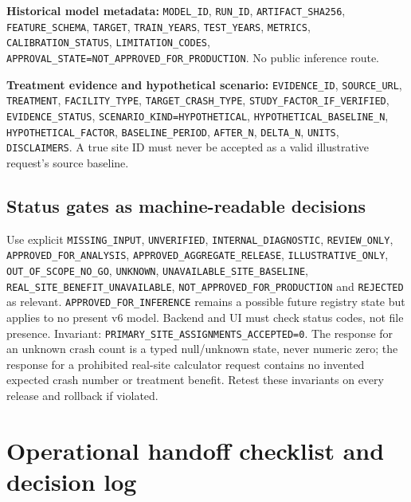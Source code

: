 \documentclass[11pt,a4paper,openany]{report}
\newcommand{\pathcode}[1]{\nolinkurl{#1}}
\begin{document}
\textbf{Historical model metadata:} \pathcode{MODEL_ID}, \pathcode{RUN_ID}, \pathcode{ARTIFACT_SHA256}, \pathcode{FEATURE_SCHEMA}, \pathcode{TARGET}, \pathcode{TRAIN_YEARS}, \pathcode{TEST_YEARS}, \pathcode{METRICS}, \pathcode{CALIBRATION_STATUS}, \pathcode{LIMITATION_CODES}, \pathcode{APPROVAL_STATE=NOT_APPROVED_FOR_PRODUCTION}. No public inference route.

\textbf{Treatment evidence and hypothetical scenario:} \pathcode{EVIDENCE_ID}, \pathcode{SOURCE_URL}, \pathcode{TREATMENT}, \pathcode{FACILITY_TYPE}, \pathcode{TARGET_CRASH_TYPE}, \pathcode{STUDY_FACTOR_IF_VERIFIED}, \pathcode{EVIDENCE_STATUS}, \pathcode{SCENARIO_KIND=HYPOTHETICAL}, \pathcode{HYPOTHETICAL_BASELINE_N}, \pathcode{HYPOTHETICAL_FACTOR}, \pathcode{BASELINE_PERIOD}, \pathcode{AFTER_N}, \pathcode{DELTA_N}, \pathcode{UNITS}, \pathcode{DISCLAIMERS}. A true site ID must never be accepted as a valid illustrative request's source baseline.

\section{Status gates as machine-readable decisions}
Use explicit \pathcode{MISSING_INPUT}, \pathcode{UNVERIFIED}, \pathcode{INTERNAL_DIAGNOSTIC}, \pathcode{REVIEW_ONLY}, \pathcode{APPROVED_FOR_ANALYSIS}, \pathcode{APPROVED_AGGREGATE_RELEASE}, \pathcode{ILLUSTRATIVE_ONLY}, \pathcode{OUT_OF_SCOPE_NO_GO}, \pathcode{UNKNOWN}, \pathcode{UNAVAILABLE_SITE_BASELINE}, \pathcode{REAL_SITE_BENEFIT_UNAVAILABLE}, \pathcode{NOT_APPROVED_FOR_PRODUCTION} and \pathcode{REJECTED} as relevant. \pathcode{APPROVED_FOR_INFERENCE} remains a possible future registry state but applies to no present v6 model. Backend and UI must check status codes, not file presence. Invariant: \pathcode{PRIMARY_SITE_ASSIGNMENTS_ACCEPTED=0}. The response for an unknown crash count is a typed null/unknown state, never numeric zero; the response for a prohibited real-site calculator request contains no invented expected crash number or treatment benefit. Retest these invariants on every release and rollback if violated.

\chapter{Operational handoff checklist and decision log}
\end{document}

